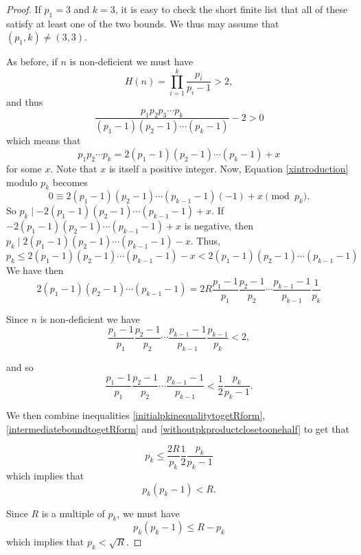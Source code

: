 \documentclass[10pt,a4paper]{amsart}
\begin{document}
\begin{proof} 

If $p_1=3$ and $k=3$, it is easy to check the short finite list that all of these satisfy at least one of the two bounds. We thus may assume that $(p_1, k) \neq (3,3)$.

As before, if $n$ is non-deficient we must have
$$H(n) = \prod_{i=1}^k \frac{p_i}{p_i-1} >2, $$
and thus 
$$\frac{p_1p_2p_3 \cdots p_k}{(p_1 -1)(p_2-1) \cdots (p_k-1)} -2 >0 $$
which means that \begin{equation}p_1p_2 \cdots p_k  = 2(p_1-1)(p_2-1)\cdots (p_k-1) +x \label{xintroduction} \end{equation} for some $x$. Note that $x$ is itself a positive integer. 
Now,  Equation \eqref{xintroduction} modulo $p_k$ becomes
$$0 \equiv 2(p_1-1)(p_2-1)\cdots(p_{k-1}-1)(-1) + x \pmod{p_k}.$$
So $p_k \mid -2(p_1-1)(p_2-1)\cdots(p_{k-1}-1) + x$.
If $-2(p_1-1)(p_2-1)\cdots(p_{k-1}-1) + x$ is negative, then
$p_k \mid 2(p_1-1)(p_2-1)\cdots(p_{k-1}-1) -x. $
Thus,
\begin{equation}p_k \leq 2(p_1-1)(p_2-1)\cdots(p_{k-1}-1) -x < 2(p_1-1)(p_2-1)\cdots(p_{k-1}-1) \label{initialpkinequalitytogetRform} \end{equation}
We have then 
\begin{equation} 2(p_1-1)(p_2-1)\cdots(p_{k-1}-1)= 2R\frac{p_1-1}{p_1}\frac{p_2-1}{p_2} \cdots \frac{p_{k-1}-1}{p_{k-1}}\frac{1}{p_k} \label{intermediateboundtogetRform}
\end{equation}

Since $n$ is non-deficient we have
$$\frac{p_1-1}{p_1}\frac{p_2-1}{p_2} \cdots \frac{p_{k-1}-1}{p_{k-1}}\frac{p_{k-1}}{p_{k}} <2, $$

and so 
\begin{equation} \frac{p_1-1}{p_1}\frac{p_2-1}{p_2} \cdots \frac{p_{k-1}-1}{p_{k-1}} < \frac{1}{2}\frac{p_k}{p_k-1} \label{withoutpkproductclosetoonehalf}.
\end{equation}

We then combine inequalities \eqref{initialpkinequalitytogetRform}, \eqref{intermediateboundtogetRform} and \eqref{withoutpkproductclosetoonehalf} to get that

$$p_k \leq \frac{2R}{p_k}\frac{1}{2}\frac{p_k}{p_k-1}$$ which implies that
\begin{equation}p_k (p_k-1) < R.\label{pktimespkminus1lessthanR}\end{equation}

Since $R$ is a multiple of $p_k$, we must have $$p_k(p_k-1) \leq R-p_k$$ which implies that $p_k < \sqrt{R}$.


\end{proof}
\end{document}
